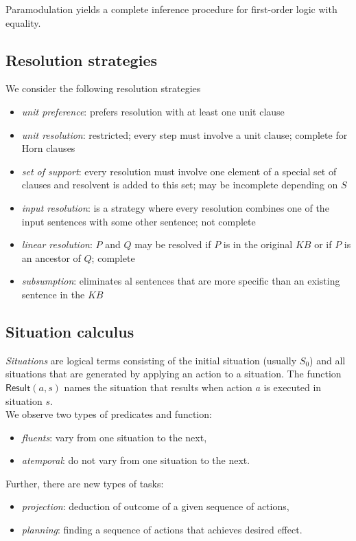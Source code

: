 \documentclass{article}
\begin{document}
\begin{theorem}[R\&N p. 355]
	Paramodulation yields a complete inference procedure for first-order logic
	with equality.
\end{theorem}

\subsection{Resolution strategies}

\begin{proposition}[R\&N p. 355]
	We consider the following resolution strategies
	\begin{itemize}
		\item \emph{unit preference}: prefers resolution with at least one unit clause
		\item \emph{unit resolution}: restricted; every step must involve a unit clause; complete for Horn clauses
		\item \emph{set of support}: every resolution must involve one element of a special
		      set of clauses and resolvent is added to this set; may be incomplete depending on $S$
		\item \emph{input resolution}: is a strategy where every resolution combines one of the
		      input sentences with some other sentence; not complete
		\item \emph{linear resolution}: $P$ and $Q$ may be resolved if $P$ is in the original
		      $KB$ or if $P$ is an ancestor of $Q$; complete
		\item \emph{subsumption}: eliminates al sentences that are more specific than an existing
		      sentence in the $KB$
	\end{itemize}
\end{proposition}


\subsection{Situation calculus}

\begin{definition}
	\emph{Situations} are logical terms consisting of the initial
	situation (usually $S_0$) and all situations that are generated
	by applying an action to a situation. The function $\textsf{Result}
		(a,s)$ names the situation that results when action $a$ is executed
	in situation $s$.\\
	We observe two types of predicates and function:
	\begin{itemize}
		\item \emph{fluents}: vary from one situation to the next,
		\item \emph{atemporal}: do not vary from one situation to the next.
	\end{itemize}
	Further, there are new types of tasks:
	\begin{itemize}
		\item \emph{projection}: deduction of outcome of a given sequence of actions,
		\item \emph{planning}: finding a sequence of actions that achieves desired effect.
	\end{itemize}
\end{definition}
\end{document}
